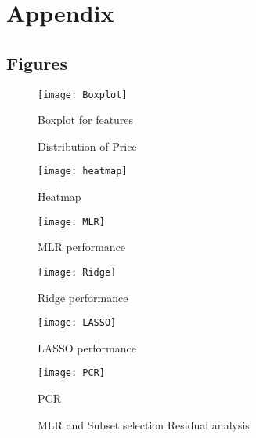 \documentclass[12pt,doublespace]{article}
\begin{document}
	\clearpage
	\section{Appendix}
	\subsection{Figures}
	
	\begin{figure}[h]
		\centering
		\texttt{[image: Boxplot]}
		\caption{Boxplot for features}
		\label{fig:boxplot}
	\end{figure}
	
	\begin{figure}[h]
		\centering
		\hfill
		\caption{ Distribution of Price}
		\label{fig:haihinh}
	\end{figure}
	
		\begin{figure}[h]
			\centering
			\texttt{[image: heatmap]}
			\caption{Heatmap}
			\label{fig:heatmap}
		\end{figure}
		
	\begin{figure}[h]
		\centering
		\texttt{[image: MLR]}
		\caption{MLR performance}
		\label{fig:mlr}
	\end{figure}
	
	\begin{figure}[h]
		\centering
		\texttt{[image: Ridge]}
		\caption{Ridge performance}
		\label{fig:ridge}
	\end{figure}
	
	\begin{figure}[h]
		\centering
		\texttt{[image: LASSO]}
		\caption{LASSO performance}
		\label{fig:lasso}
	\end{figure}
	
	\begin{figure}[h]
		\centering
		\texttt{[image: PCR]}
		\caption{PCR}
		\label{fig:pcr}
	\end{figure}
	
	\begin{figure}[h]
		\centering
		\hfill
		\caption{ MLR and Subset selection Residual analysis}
		\label{fig:MS}
	\end{figure}
	
\end{document}
